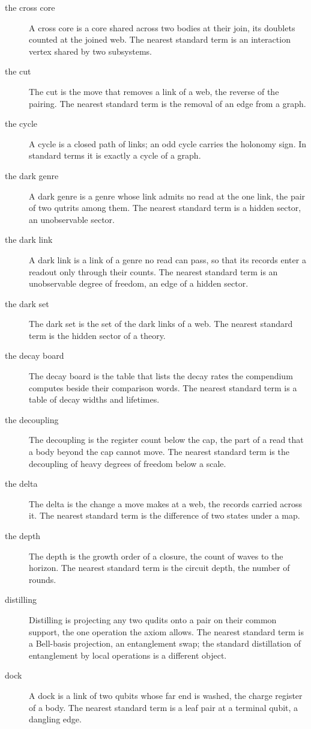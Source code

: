 \begin{description}
\item[the cross core] A cross core is a core shared across two bodies at their join, its doublets counted at the joined web. The nearest standard term is an interaction vertex shared by two subsystems.
\item[the cut] The cut is the move that removes a link of a web, the reverse of the pairing. The nearest standard term is the removal of an edge from a graph.
\item[the cycle] A cycle is a closed path of links; an odd cycle carries the holonomy sign. In standard terms it is exactly a cycle of a graph.
\item[the dark genre] A dark genre is a genre whose link admits no read at the one link, the pair of two qutrits among them. The nearest standard term is a hidden sector, an unobservable sector.
\item[the dark link] A dark link is a link of a genre no read can pass, so that its records enter a readout only through their counts. The nearest standard term is an unobservable degree of freedom, an edge of a hidden sector.
\item[the dark set] The dark set is the set of the dark links of a web. The nearest standard term is the hidden sector of a theory.
\item[the decay board] The decay board is the table that lists the decay rates the compendium computes beside their comparison words. The nearest standard term is a table of decay widths and lifetimes.
\item[the decoupling] The decoupling is the register count below the cap, the part of a read that a body beyond the cap cannot move. The nearest standard term is the decoupling of heavy degrees of freedom below a scale.
\item[the delta] The delta is the change a move makes at a web, the records carried across it. The nearest standard term is the difference of two states under a map.
\item[the depth] The depth is the growth order of a closure, the count of waves to the horizon. The nearest standard term is the circuit depth, the number of rounds.
\item[distilling] Distilling is projecting any two qudits onto a pair on their common support, the one operation the axiom allows. The nearest standard term is a Bell-basis projection, an entanglement swap; the standard distillation of entanglement by local operations is a different object.
\item[dock] A dock is a link of two qubits whose far end is washed, the charge register of a body. The nearest standard term is a leaf pair at a terminal qubit, a dangling edge.

\end{description}
